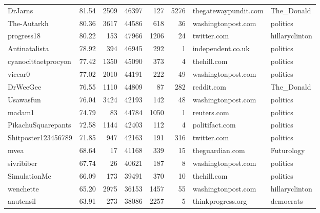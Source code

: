 \begin{tabular}{lrrrrrll}
DrJarns             &      81.54 &    2509 &    46397 &         127 &        5276 &  thegatewaypundit.com &       The\_Donald \\
The-Autarkh         &      80.36 &    3617 &    44586 &         618 &          36 &    washingtonpost.com &         politics \\
progress18          &      80.22 &     153 &    47966 &        1206 &          24 &           twitter.com &   hillaryclinton \\
Antinatalista       &      78.92 &     394 &    46945 &         292 &           1 &     independent.co.uk &         politics \\
cyanocittaetprocyon &      77.42 &    1350 &    45090 &         373 &           4 &           thehill.com &         politics \\
viccar0             &      77.02 &    2010 &    44191 &         222 &          49 &    washingtonpost.com &         politics \\
DrWeeGee            &      76.55 &    1110 &    44809 &          87 &         282 &            reddit.com &       The\_Donald \\
Usawasfun           &      76.04 &    3424 &    42193 &         142 &          48 &    washingtonpost.com &         politics \\
madam1              &      74.79 &      83 &    44784 &        1050 &           1 &           reuters.com &         politics \\
PikachuSquarepants  &      72.58 &    1144 &    42403 &         112 &           4 &        politifact.com &         politics \\
Shitposter123456789 &      71.85 &     947 &    42163 &         191 &         316 &           twitter.com &         politics \\
mvea                &      68.64 &      17 &    41168 &         339 &          15 &       theguardian.com &       Futurology \\
sivribiber          &      67.74 &      26 &    40621 &         187 &           8 &    washingtonpost.com &         politics \\
SimulationMe        &      66.09 &     173 &    39491 &         370 &          10 &           thehill.com &         politics \\
wenchette           &      65.20 &    2975 &    36153 &        1457 &          55 &    washingtonpost.com &   hillaryclinton \\
anutensil           &      63.91 &     273 &    38086 &        2257 &           5 &     thinkprogress.org &        democrats \\
\bottomrule
\end{tabular}
